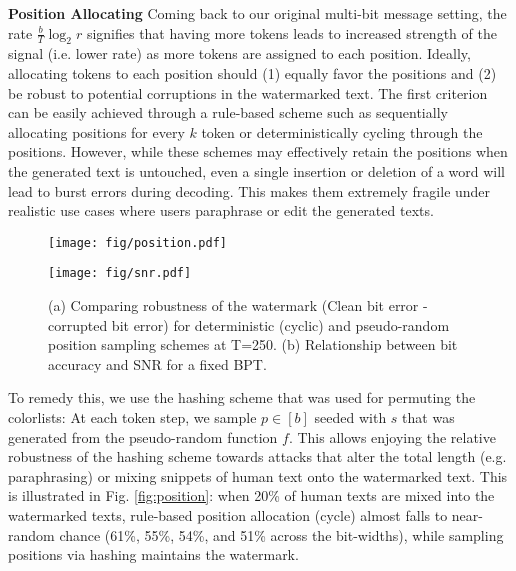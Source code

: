 \noindent \textbf{Position Allocating}
Coming back to our original multi-bit message setting, the rate $\frac{b}{T} \log_2 r$ signifies that having more tokens leads to increased strength of the signal (i.e. lower rate) as more tokens are assigned to each position. Ideally, allocating tokens to each position should (1) equally favor the positions and (2) be robust to potential corruptions in the watermarked text. The first criterion can be easily achieved through a rule-based scheme such as sequentially allocating positions for every $k$ token or deterministically cycling through the positions. 
However, while these schemes may effectively retain the positions when the generated text is untouched, even a single insertion or deletion of a word will lead to burst errors during decoding. This makes them extremely fragile under realistic use cases where users paraphrase or edit the generated texts. 

\begin{figure}
\begin{minipage}[t]{.49\textwidth}
    \centering
    \texttt{[image: fig/position.pdf]}
    \subcaption{}\label{fig:position}
\end{minipage}\hfill
\begin{minipage}[t]{.49\textwidth}
    \centering
    \texttt{[image: fig/snr.pdf]}
    \subcaption{}\label{fig:snr}
\end{minipage}
\caption{(a) Comparing robustness of the watermark (Clean bit error - corrupted bit error) for deterministic (cyclic) and pseudo-random position sampling schemes at T=250. (b) Relationship between bit accuracy and SNR for a fixed BPT.}
\end{figure}

To remedy this, we use the hashing scheme that was used for permuting the colorlists: At each token step, we sample $p \in [b]$ seeded with $s$ that was generated from the pseudo-random function $f$. This allows enjoying the relative robustness of the hashing scheme towards attacks that alter the total length (e.g. paraphrasing) or mixing snippets of human text onto the watermarked text. This is illustrated in Fig. \ref{fig:position}: when 20\% of human texts are mixed into the watermarked texts, rule-based position allocation (cycle) almost falls to near-random chance (61\%, 55\%, 54\%, and 51\% across the bit-widths), while sampling positions via hashing maintains the watermark. 

